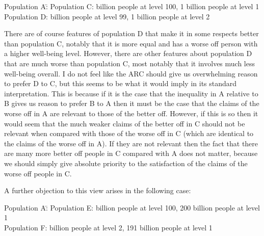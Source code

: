 \documentclass[man,11pt,a4paper]{apa7}
\begin{document}
\begin{tabbing}
Population A:\quad\= \kill
Population C:  billion people at level 100, 1 billion people at level 1 \\
Population D:  billion people at level 99, 1 billion people at level 2
\end{tabbing}

There are of course features of population D that make it in some respects better than population C, notably that it is more equal and has a worse off person with a higher well-being level. However, there are other features about population D that are much worse than population C, most notably that it involves much less well-being overall. I do not feel like the ARC should give us overwhelming reason to prefer D to C, but this seems to be what it would imply in its standard interpretation. This is because if it is the case that the inequality in A relative to B gives us reason to prefer B to A then it must be the case that the claims of the worse off in A are relevant to those of the better off. However, if this is so then it would seem that the much weaker claims of the better off in C should not be relevant when compared with those of the worse off in C (which are identical to the claims of the worse off in A). If they are not relevant then the fact that there are many more better off people in C compared with A does not matter, because we should simply give absolute priority to the satisfaction of the claims of the worse off people in C.

A further objection to this view arises in the following case:

\begin{tabbing}
Population A:\quad\= \kill
Population E:  billion people at level 100, 200 billion people at level 1 \\
Population F:  billion people at level 2, 191 billion people at level 1
\end{tabbing}
\end{document}
